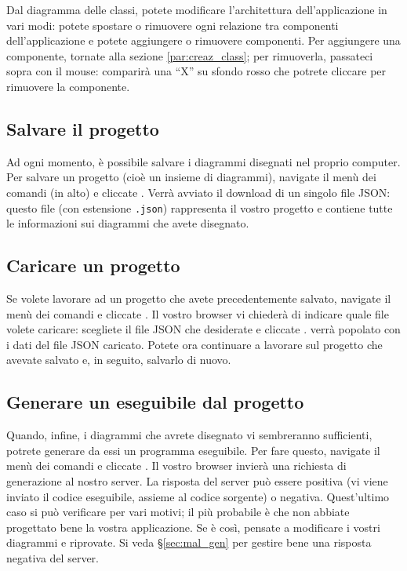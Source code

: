 Dal diagramma delle classi, potete modificare l'architettura dell'applicazione in vari modi: potete spostare o rimuovere ogni relazione tra componenti dell'applicazione e potete aggiungere o rimuovere componenti. Per aggiungere una componente, tornate alla sezione \ref{par:creaz_class}; per rimuoverla, passateci sopra con il mouse: comparirà una “X” su sfondo rosso che potrete cliccare per rimuovere la componente.



\subsection{Salvare il progetto} \label{sec:save}

Ad ogni momento, è possibile salvare i diagrammi disegnati nel proprio computer. Per salvare un progetto (cioè un insieme di diagrammi), navigate il menù dei comandi (in alto) e cliccate . Verrà avviato il download di un singolo file JSON: questo file (con estensione \texttt{.json}) rappresenta il vostro progetto e contiene tutte le informazioni sui diagrammi che avete disegnato.



\subsection{Caricare un progetto} \label{sec:load}

Se volete lavorare ad un progetto che avete precedentemente salvato, navigate il menù dei comandi e cliccate . Il vostro browser vi chiederà di indicare quale file volete caricare: scegliete il file JSON che desiderate e cliccate . \proj{} verrà popolato con i dati del file JSON caricato. Potete ora continuare a lavorare sul progetto che avevate salvato e, in seguito, salvarlo di nuovo.



\subsection{Generare un eseguibile dal progetto} \label{sec:gen}

Quando, infine, i diagrammi che avrete disegnato vi sembreranno sufficienti, potrete generare da essi un programma eseguibile. Per fare questo, navigate il menù dei comandi e cliccate . Il vostro browser invierà una richiesta di generazione al nostro server. La risposta del server può essere positiva (vi viene inviato il codice eseguibile, assieme al codice sorgente) o negativa. Quest'ultimo caso si può verificare per vari motivi; il più probabile è che non abbiate progettato bene la vostra applicazione. Se è così, pensate a modificare i vostri diagrammi e riprovate. Si veda §\ref{sec:mal_gen} per gestire bene una risposta negativa del server.



